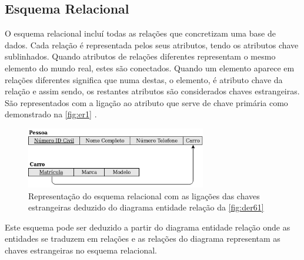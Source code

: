 \documentclass[11pt,twoside,a4paper]{report}
\begin{document}
\subsection{Esquema Relacional}
O esquema relacional incluí todas as relações que concretizam uma base de dados. Cada relação é representada pelos seus atributos, tendo os atributos chave sublinhados. Quando atributos de relações diferentes representam o mesmo elemento do mundo real, estes são conectados. Quando um elemento aparece em relações diferentes significa que numa destas, o elemento, é atributo chave da relação e assim sendo, os restantes atributos são considerados chaves estrangeiras. São representados com a ligação ao atributo que serve de chave primária como demonstrado na \autoref{fig:er1} \cite{Chen}.
\begin{figure}
	\begin{center}
		\includegraphics[width=0.7\textwidth]{notacao15} %
		\caption[Representação esquema relacional]{Representação do esquema relacional com as ligações das chaves estrangeiras deduzido do diagrama entidade relação da \autoref{fig:der61}}
		\label{fig:er1}
	\end{center}
\end{figure}
Este esquema pode ser deduzido a partir do diagrama entidade relação onde as entidades se traduzem em relações e as relações do diagrama representam as chaves estrangeiras no esquema relacional.
\end{document}
